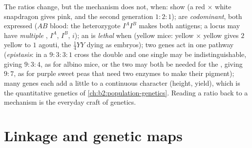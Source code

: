 \begin{proposition}\label{prop:b2:meiosis-heredity:extensions}
The ratios change, but the mechanism does not, when:  show
\emph{} (a red $\times$ white snapdragon gives
pink, and the second generation $1 : 2 : 1$);  are
\emph{codominant}, both expressed ($AB$ blood: the heterozygote
$I^AI^B$ makes both antigens; a locus may have \emph{multiple
}, $I^A$, $I^B$, $i$); an  is \emph{lethal} when
 (yellow mice: yellow $\times$ yellow gives $2$ yellow to
$1$ agouti, the $\tfrac14 YY$ dying as embryos); two genes act in
one pathway (\emph{epistasis}: in a $9 : 3 : 3 : 1$ cross the double
 and one single  may be indistinguishable, giving
$9 : 3 : 4$, as for albino mice, or the two  may both be
needed for the , giving $9 : 7$, as for purple sweet peas
that need two enzymes to make their pigment); many genes each add a
little to a continuous character (height, yield), which is the
quantitative genetics of \cref{ch:b2:population-genetics}. Reading
a ratio back to a mechanism is the everyday craft of genetics.
\end{proposition}

\section{Linkage and genetic maps}

